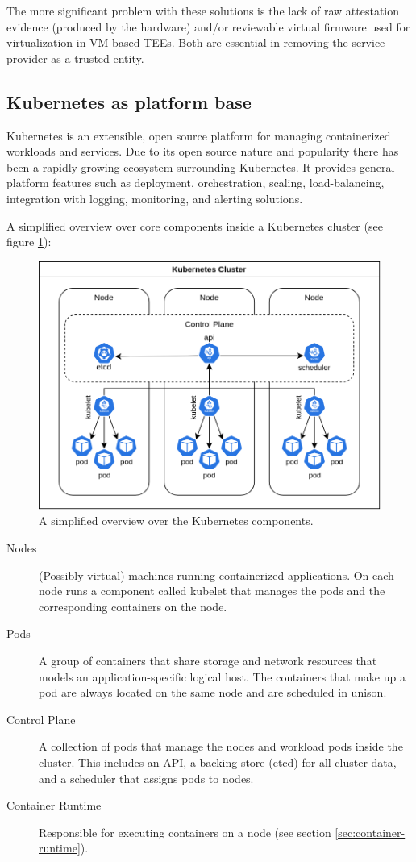 The more significant problem with these solutions is the lack of raw attestation
evidence (produced by the hardware) and/or reviewable virtual firmware used for
virtualization in VM-based TEEs. Both are essential in removing the service
provider as a trusted entity.

\subsection{Kubernetes as platform base}
\label{sec:kubernetes-platform-base}

Kubernetes is an extensible, open source platform for managing containerized
workloads and services. Due to its open source nature and popularity there has
been a rapidly growing ecosystem surrounding Kubernetes. It provides general
platform features such as deployment, orchestration, scaling, load-balancing,
integration with logging, monitoring, and alerting solutions.

A simplified overview over core components inside a Kubernetes cluster (see
figure \ref{fig:kubernetes-overview}):

\begin{figure}
  \centering
  \includegraphics[width=0.8\linewidth]{resources/kubernetes-overview.png}
  \caption{A simplified overview over the Kubernetes components.}
  \label{fig:kubernetes-overview}
\end{figure}

\begin{description}
  \item[Nodes]
    (Possibly virtual) machines running containerized applications. On each node
    runs a component called kubelet that manages the pods and the corresponding
    containers on the node.
  \item[Pods]
    A group of containers that share storage and network resources that models
    an application-specific logical host. The containers that make up a pod are
    always located on the same node and are scheduled in unison.
  \item[Control Plane]
    A collection of pods that manage the nodes and workload pods inside the
    cluster. This includes an API, a backing store (etcd) for all cluster data,
    and a scheduler that assigns pods to nodes.
  \item[Container Runtime]
    Responsible for executing containers on a node (see section
    \ref{sec:container-runtime}).
\end{description}

